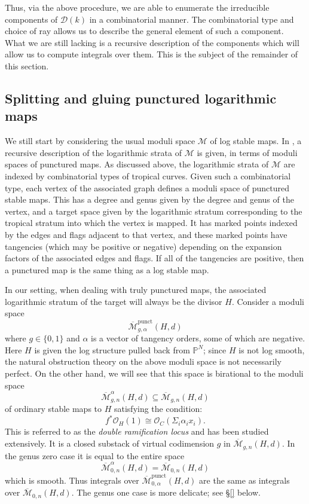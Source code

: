 \documentclass[11pt]{amsart}
\newcommand{\M}[4]{\overline{\mathcal{M}}_{#1,#2}(#3,#4)}
\newcommand{\Mpunct}[4]{\overline{\mathcal{M}}^{\operatorname{punct}}_{#1,#2}(#3,#4)}
\newcommand{\PP}{\mathbb P}
\newcommand{\OO}{\mathcal{O}}
\newcommand{\Mcal}{\mathcal{M}}
\newcommand{\Dcal}{\mathcal{D}}
\newcommand{\ol}[1]{\overline{#1}}
\theoremstyle{definition}
\theoremstyle{definition}
\begin{document}
Thus, via the above procedure, we are able to enumerate the irreducible components of $\Dcal(k)$ in a combinatorial manner. The combinatorial type and choice of ray allows us to describe the general element of such a component. What we are still lacking is a recursive description of the components which will allow us to compute integrals over them. This is the subject of the remainder of this section.

\subsection{Splitting and gluing punctured logarithmic maps}\label{subsection punctured maps} We still start by considering the usual moduli space $\Mcal$ of log stable maps. In \cite{PuncturedMaps}, a recursive description of the logarithmic strata of $\Mcal$ is given, in terms of moduli spaces of punctured maps. As discussed above, the logarithmic strata of $\Mcal$ are indexed by combinatorial types of tropical curves. Given such a combinatorial type, each vertex of the associated graph defines a moduli space of punctured stable maps. This has a degree and genus given by the degree and genus of the vertex, and a target space given by the logarithmic stratum corresponding to the tropical stratum into which the vertex is mapped. It has marked points indexed by the edges and flags adjacent to that vertex, and these marked points have tangencies (which may be positive or negative) depending on the expansion factors of the associated edges and flags. If all of the tangencies are positive, then a punctured map is the same thing as a log stable map.

In our setting, when dealing with truly punctured maps, the associated logarithmic stratum of the target will always be the divisor $H$. Consider a moduli space
\begin{equation*} \Mpunct{g}{\alpha}{H}{d} \end{equation*}
where $g \in \{0,1\}$ and $\alpha$ is a vector of tangency orders, some of which are negative. Here $H$ is given the log structure pulled back from $\PP^N$; since $H$ is not log smooth, the natural obstruction theory on the above moduli space is not necessarily perfect. On the other hand, we will see that this space is birational to the moduli space
\begin{equation*} \ol\Mcal^{\alpha}_{g,n}(H,d) \subseteq \M{g}{n}{H}{d} \end{equation*}
of ordinary stable maps to $H$ satisfying the condition:
\begin{equation*} f^*\OO_H(1) \cong \OO_C(\Sigma_i \alpha_ix_i).\end{equation*}
This is referred to as the \emph{double ramification locus} and has been studied extensively. It is a closed substack of virtual codimension $g$ in $\M{g}{n}{H}{d}$. In the genus zero case it is equal to the entire space
\begin{equation*} \ol\Mcal^{\alpha}_{0,n}(H,d) = \M{0}{n}{H}{d} \end{equation*}
which is smooth. Thus integrals over $\Mpunct{0}{\alpha}{H}{d}$ are the same as integrals over $\M{0}{n}{H}{d}$. The genus one case is more delicate; see \S \ref{} below.
\end{document}

